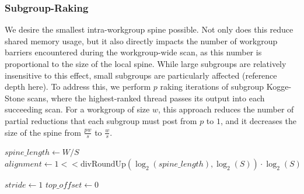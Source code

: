 \documentclass[sigconf]{acmart}
\newcommand{\john}[1]{{\footnotesize\color{cyan}[John: #1]}}
\begin{document}
\subsubsection{Subgroup-Raking}
We desire the smallest intra-workgroup spine possible. Not only does this reduce shared memory usage, but it also directly impacts the number of workgroup barriers encountered during the workgroup-wide scan, as this number is proportional to the size of the local spine. While large subgroups are relatively insensitive to this effect, small subgroups are particularly affected (reference depth here). To address this, we perform $p$ raking iterations of subgroup Kogge-Stone scans, where the highest-ranked thread passes its output into each succeeding scan. For a workgroup of size $w$, this approach reduces the number of partial reductions that each subgroup must post from $p$ to $1$, and it decreases the size of the spine from $\frac{pw}{s}$ to $\frac{w}{s}$.
\begin{algorithm}[htbp]
  \small
  \SetAlgoLined

  $spine\_length \gets W / S$\;
  $alignment \gets 1 << \text{divRoundUp}(\log_2(spine\_length), \log_2(S)) \cdot \log_2(S)$\;

  $stride \gets 1$\;
  $top\_offset \gets 0$\;

  \;
  \caption{Workgroup-Wide Scan. \john{Sorry to say that every one of those variable names need to be wrapped in \texttt{\textbackslash textit}. ``Typeset in math mode'' is not the same as ``Typeset in italics'' (see $offset$ vs.\ \textit{offset}).}}
  \label{alg:example}
\end{algorithm}
\end{document}
